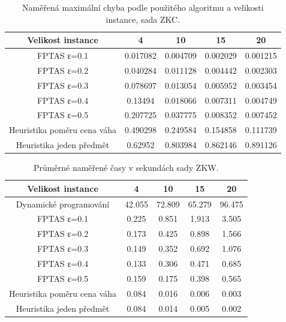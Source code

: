 \documentclass[12pt]{article}
\begin{document}
\begin{table}[h!]
\centering
\begin{tabular}{ | c | | c | c | c | c | }\hline
Velikost instance & 4 & 10 & 15 & 20 \\ \hline \hline
FPTAS ε=0.1 & 0.017082 & 0.004709 & 0.002029 & 0.001215  \\ \hline
FPTAS ε=0.2 & 0.040284 & 0.011128 & 0.004442 & 0.002303  \\ \hline
FPTAS ε=0.3 & 0.078697 & 0.013054 & 0.005952 & 0.003454  \\ \hline
FPTAS ε=0.4 & 0.13494 & 0.018066 & 0.007311 & 0.004749  \\ \hline
FPTAS ε=0.5 & 0.207725 & 0.037775 & 0.008352 & 0.007452  \\ \hline
Heuristika poměru cena váha & 0.490298 & 0.249584 & 0.154858 & 0.111739  \\ \hline
Heuristika jeden předmět & 0.62952 & 0.803984 & 0.862146 & 0.891126  \\ \hline
\end{tabular}
\caption{Naměřená maximální chyba podle použitého algoritmu a velikosti instance, sada  ZKC.}
\label{ZKC_error_table}
\end{table}

\begin{table}[h!]
\centering
\begin{tabular}{ | c | | c | c | c | c | }\hline
Velikost instance & 4 & 10 & 15 & 20 \\ \hline \hline
Dynamické programování & 42.055 & 72.809 & 65.279 & 96.475  \\ \hline
FPTAS ε=0.1 & 0.225 & 0.851 & 1.913 & 3.505  \\ \hline
FPTAS ε=0.2 & 0.173 & 0.425 & 0.898 & 1.566  \\ \hline
FPTAS ε=0.3 & 0.149 & 0.352 & 0.692 & 1.076  \\ \hline
FPTAS ε=0.4 & 0.133 & 0.306 & 0.471 & 0.685  \\ \hline
FPTAS ε=0.5 & 0.159 & 0.175 & 0.398 & 0.565  \\ \hline
Heuristika poměru cena váha & 0.084 & 0.016 & 0.006 & 0.003  \\ \hline
Heuristika jeden předmět & 0.084 & 0.014 & 0.005 & 0.002  \\ \hline
\end{tabular}
\caption{Průměrné naměřené časy v sekundách sady ZKW.}
\label{ZKW_table}
\end{table}
\end{document}
